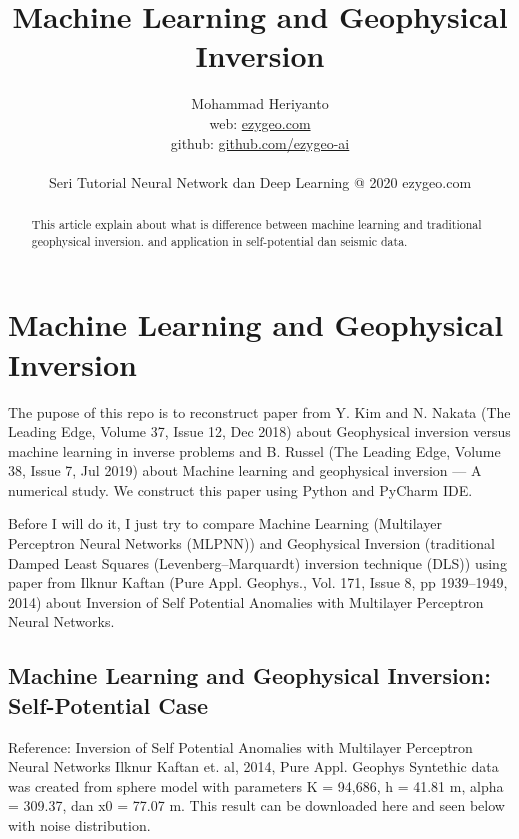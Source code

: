 \documentclass[12pt,oneside,a4paper]{article}
\begin{document}
\title{Machine Learning and Geophysical Inversion}
\author{Mohammad Heriyanto \\web: \href{https://ezygeo.com/}{ezygeo.com} \\ github: \href{https://github.com/ezygeo-ai/machine-learning-and-geophysical-inversion}{github.com/ezygeo-ai} \\~\\ Seri Tutorial Neural Network dan Deep Learning @ 2020 ezygeo.com}
   
\maketitle

\begin{abstract}
This article explain about what is difference between machine learning and traditional geophysical inversion. and application in self-potential dan seismic data.
\end{abstract}

\section{Machine Learning and Geophysical Inversion}
The pupose of this repo is to reconstruct paper from Y. Kim and N. Nakata (The Leading Edge, Volume 37, Issue 12, Dec 2018) about Geophysical inversion versus machine learning in inverse problems and B. Russel (The Leading Edge, Volume 38, Issue 7, Jul 2019) about Machine learning and geophysical inversion — A numerical study. We construct this paper using Python and PyCharm IDE.

Before I will do it, I just try to compare Machine Learning (Multilayer Perceptron Neural Networks (MLPNN)) and Geophysical Inversion (traditional Damped Least Squares (Levenberg–Marquardt) inversion technique (DLS)) using paper from Ilknur Kaftan (Pure Appl. Geophys., Vol. 171, Issue 8, pp 1939–1949, 2014) about Inversion of Self Potential Anomalies with Multilayer Perceptron Neural Networks.

\subsection{Machine Learning and Geophysical Inversion: Self-Potential Case}

Reference: Inversion of Self Potential Anomalies with Multilayer Perceptron Neural Networks Ilknur Kaftan et. al, 2014, Pure Appl. Geophys Syntethic data was created from sphere model with parameters K = 94,686, h = 41.81 m, alpha = 309.37, dan x0 = 77.07 m. This result can be downloaded here and seen below with noise distribution.
\end{document}
